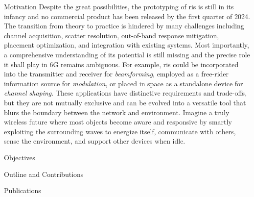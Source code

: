 \begin{section}{Motivation}
	Despite the great possibilities, the prototyping of \gls{ris} is still in its infancy and no commercial product has been released by the first quarter of 2024.
	The transition from theory to practice is hindered by many challenges including channel acquisition, scatter resolution, out-of-band response mitigation, placement optimization, and integration with existing systems.
	Most importantly, a comprehensive understanding of its potential is still missing and the precise role it shall play in 6G remains ambiguous.
	For example, \gls{ris} could be incorporated into the transmitter and receiver for \emph{beamforming}, employed as a free-rider information source for \emph{modulation}, or placed in space as a standalone device for \emph{channel shaping}.
	These applications have distinctive requirements and trade-offs, but they are not mutually exclusive and can be evolved into a versatile tool that blurs the boundary between the network and environment.
	Imagine a truly wireless future where most objects become aware and responsive by smartly exploiting the surrounding waves to energize itself, communicate with others, sense the environment, and support other devices when idle.
\end{section}

\begin{section}{Objectives}

\end{section}

\begin{section}{Outline and Contributions}

\end{section}

\begin{section}{Publications}
\end{section}
